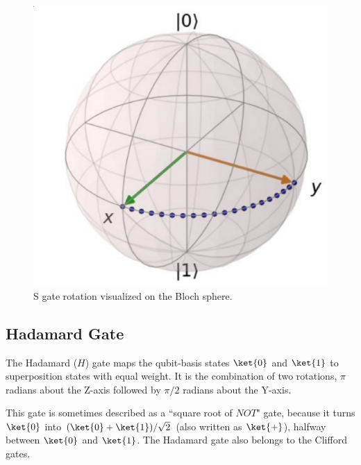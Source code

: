 \documentclass[11pt, notitlepage]{report}
\begin{document}
\begin{figure}[ht]
  \centering
  \includegraphics[scale=0.22]{images/s_gate.eps}
  \caption{S gate rotation visualized on the Bloch sphere.}
  \label{fig:s_bloch}
\end{figure}

\subsection{Hadamard Gate}
The Hadamard ($H$) gate maps the qubit-basis states $\ket{0}$ and $\ket{1}$ to superposition states with equal weight. It is the combination of two rotations, $\pi$ radians about the Z-axis followed by $\pi/2$ radians about the Y-axis.

This gate is sometimes described as a ``square root of $NOT$" gate, because it turns $\ket{0}$ into $(\ket{0} + \ket{1})/\sqrt2$ (also written as $\ket{+}$), halfway between $\ket{0}$ and $\ket{1}$. The Hadamard gate also belongs to the Clifford gates.
\end{document}
